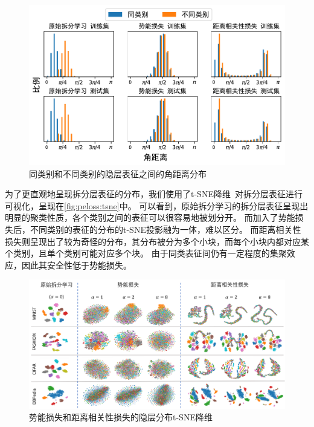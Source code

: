 \begin{figure}[h!]
    \centering
    \includegraphics[width=0.8\linewidth]{Z_Resources/peloss_angular-distance}
    \caption{同类别和不同类别的隐层表征之间的角距离分布}
    \label{fig:peloss:angular-distance}
\end{figure}

为了更直观地呈现拆分层表征的分布，我们使用了t-SNE降维~\cite{van_2008_tsne}对拆分层表征进行可视化，呈现在\autoref{fig:peloss:tsne}中。
%
可以看到，原始拆分学习的拆分层表征呈现出明显的聚类性质，各个类别之间的表征可以很容易地被划分开。
%
而加入了势能损失后，不同类别的表征的分布的t-SNE投影融为一体，难以区分。
%
而距离相关性损失则呈现出了较为奇怪的分布，其分布被分为多个小块，而每个小块内都对应某个类别，且单个类别可能对应多个块。
由于同类表征间仍有一定程度的集聚效应，因此其安全性低于势能损失。

\begin{figure}[h!]
    \centering
    \includegraphics[width=1\linewidth]{Z_Resources/peloss_tsne}
    \caption{势能损失和距离相关性损失的隐层分布t-SNE降维}
    \label{fig:peloss:tsne}
\end{figure}


